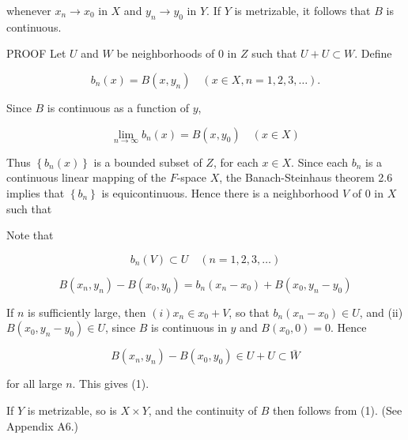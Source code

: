 \documentclass[10pt]{article}
\begin{document}
whenever $x_{n} \rightarrow x_{0}$ in $X$ and $y_{n} \rightarrow y_{0}$ in $Y$. If $Y$ is metrizable, it follows that $B$ is continuous.

PROOF Let $U$ and $W$ be neighborhoods of 0 in $Z$ such that $U+U \subset W$. Define

$$
b_{n}(x)=B\left(x, y_{n}\right) \quad(x \in X, n=1,2,3, \ldots) .
$$

Since $B$ is continuous as a function of $y$,

$$
\lim _{n \rightarrow \infty} b_{n}(x)=B\left(x, y_{0}\right) \quad(x \in X)
$$

Thus $\left\{b_{n}(x)\right\}$ is a bounded subset of $Z$, for each $x \in X$. Since each $b_{n}$ is a continuous linear mapping of the $F$-space $X$, the Banach-Steinhaus theorem 2.6 implies that $\left\{b_{n}\right\}$ is equicontinuous. Hence there is a neighborhood $V$ of 0 in $X$ such that

Note that

$$
b_{n}(V) \subset U \quad(n=1,2,3, \ldots)
$$

$$
B\left(x_{n}, y_{n}\right)-B\left(x_{0}, y_{0}\right)=b_{n}\left(x_{n}-x_{0}\right)+B\left(x_{0}, y_{n}-y_{0}\right)
$$

If $n$ is sufficiently large, then $(i) x_{n} \in x_{0}+V$, so that $b_{n}\left(x_{n}-x_{0}\right) \in U$, and (ii) $B\left(x_{0}, y_{n}-y_{0}\right) \in U$, since $B$ is continuous in $y$ and $B\left(x_{0}, 0\right)=0$. Hence

$$
B\left(x_{n}, y_{n}\right)-B\left(x_{0}, y_{0}\right) \in U+U \subset \bar{W}
$$

for all large $n$. This gives (1).

If $Y$ is metrizable, so is $X \times Y$, and the continuity of $B$ then follows from (1). (See Appendix A6.)
\end{document}
